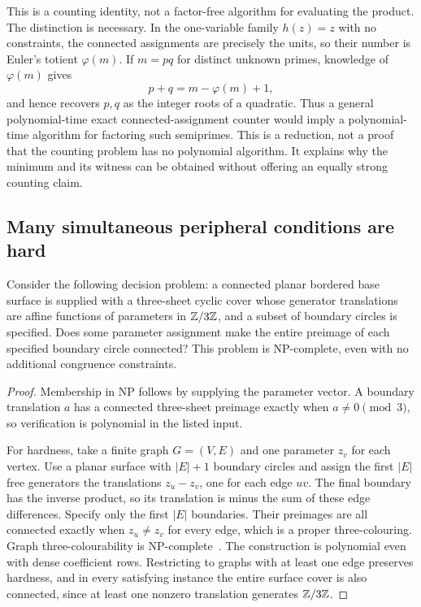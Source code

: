 This is a counting identity, not a factor-free algorithm for evaluating
the product. The distinction is necessary. In the one-variable family
$h(z)=z$ with no constraints, the connected assignments are precisely
the units, so their number is Euler's totient $\varphi(m)$. If
$m=pq$ for distinct unknown primes, knowledge of $\varphi(m)$ gives
\[
 p+q=m-\varphi(m)+1,
\]
and hence recovers $p,q$ as the integer roots of a quadratic. Thus a
general polynomial-time exact connected-assignment counter would imply
a polynomial-time algorithm for factoring such semiprimes. This is a
reduction, not a proof that the counting problem has no polynomial
algorithm. It explains why the minimum and its witness can be obtained
without offering an equally strong counting claim.

\subsection{Many simultaneous peripheral conditions are hard}

\begin{theorem}
\label{thm:peripheral-hardness}
Consider the following decision problem: a connected planar bordered base
surface is supplied with a three-sheet cyclic cover whose generator
translations are affine functions of parameters in $\mathbb Z/3\mathbb Z$, and a
subset of boundary circles is specified. Does some parameter assignment
make the entire preimage of each specified boundary circle connected?
This problem is NP-complete, even with no additional congruence constraints.
\end{theorem}
\begin{proof}
Membership in NP follows by supplying the parameter vector. A boundary
translation $a$ has a connected three-sheet preimage exactly when
$a\ne0\pmod3$, so verification is polynomial in the listed input.

For hardness, take a finite graph $G=(V,E)$ and one parameter $z_v$ for
each vertex. Use a planar surface with $|E|+1$ boundary circles and
assign the first $|E|$ free generators the translations $z_u-z_v$,
one for each edge $uv$. The final boundary has the inverse product,
so its translation is minus the sum of these edge differences. Specify
only the first $|E|$ boundaries. Their preimages are all connected exactly
when $z_u\ne z_v$ for every edge, which is a proper three-colouring.
Graph three-colourability is NP-complete~\cite{gjs}. The construction is
polynomial even with dense coefficient rows. Restricting to graphs with
at least one edge preserves hardness, and in every satisfying instance
the entire surface cover is also connected, since at least one nonzero
translation generates $\mathbb Z/3\mathbb Z$.
\end{proof}

